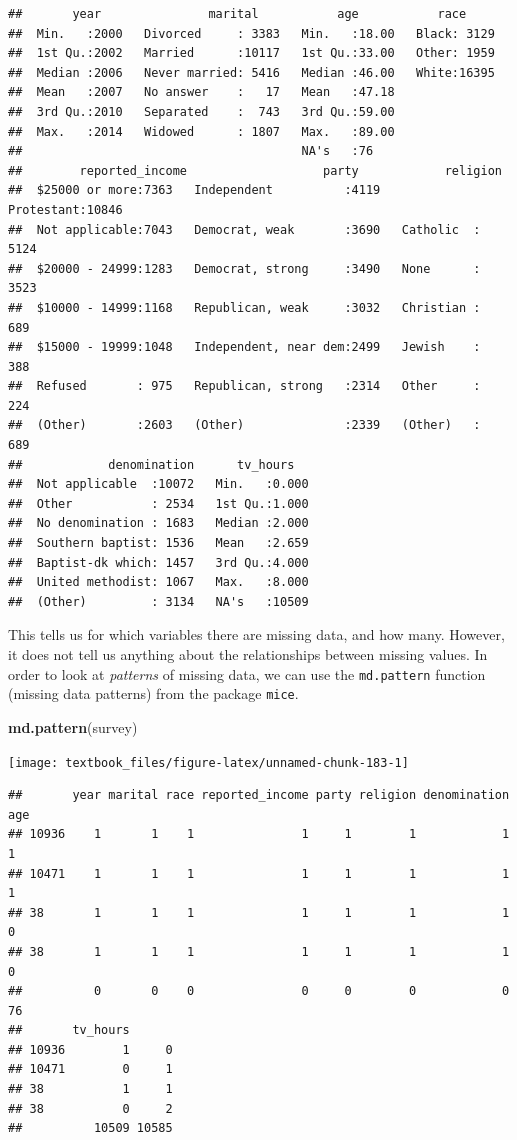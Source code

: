 \documentclass[]{tufte-book}
\newenvironment{Shaded}{}{}
\newcommand{\KeywordTok}[1]{\textcolor[rgb]{0.00,0.44,0.13}{\textbf{#1}}}
\newcommand{\NormalTok}[1]{#1}
\begin{document}
\begin{verbatim}
##       year               marital           age           race      
##  Min.   :2000   Divorced     : 3383   Min.   :18.00   Black: 3129  
##  1st Qu.:2002   Married      :10117   1st Qu.:33.00   Other: 1959  
##  Median :2006   Never married: 5416   Median :46.00   White:16395  
##  Mean   :2007   No answer    :   17   Mean   :47.18                
##  3rd Qu.:2010   Separated    :  743   3rd Qu.:59.00                
##  Max.   :2014   Widowed      : 1807   Max.   :89.00                
##                                       NA's   :76                   
##        reported_income                   party            religion    
##  $25000 or more:7363   Independent          :4119   Protestant:10846  
##  Not applicable:7043   Democrat, weak       :3690   Catholic  : 5124  
##  $20000 - 24999:1283   Democrat, strong     :3490   None      : 3523  
##  $10000 - 14999:1168   Republican, weak     :3032   Christian :  689  
##  $15000 - 19999:1048   Independent, near dem:2499   Jewish    :  388  
##  Refused       : 975   Republican, strong   :2314   Other     :  224  
##  (Other)       :2603   (Other)              :2339   (Other)   :  689  
##            denomination      tv_hours    
##  Not applicable  :10072   Min.   :0.000  
##  Other           : 2534   1st Qu.:1.000  
##  No denomination : 1683   Median :2.000  
##  Southern baptist: 1536   Mean   :2.659  
##  Baptist-dk which: 1457   3rd Qu.:4.000  
##  United methodist: 1067   Max.   :8.000  
##  (Other)         : 3134   NA's   :10509
\end{verbatim}

This tells us for which variables there are missing data, and how many. However, it does not tell us anything about the relationships between missing values. In order to look at \emph{patterns} of missing data, we can use the \texttt{md.pattern} function (missing data patterns) from the package \texttt{mice}.

\begin{Shaded}
\begin{Highlighting}[]
\KeywordTok{md.pattern}\NormalTok{(survey)}
\end{Highlighting}
\end{Shaded}

\texttt{[image: textbook\_files/figure-latex/unnamed-chunk-183-1]}

\begin{verbatim}
##       year marital race reported_income party religion denomination age
## 10936    1       1    1               1     1        1            1   1
## 10471    1       1    1               1     1        1            1   1
## 38       1       1    1               1     1        1            1   0
## 38       1       1    1               1     1        1            1   0
##          0       0    0               0     0        0            0  76
##       tv_hours      
## 10936        1     0
## 10471        0     1
## 38           1     1
## 38           0     2
##          10509 10585
\end{verbatim}
\end{document}
